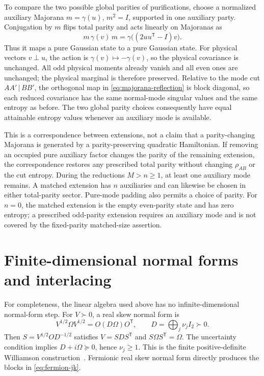 \documentclass[11pt,a4paper]{article}
\numberwithin{equation}{section}
\theoremstyle{remark}
\newcommand{\T}{\mathsf T}
\begin{document}
To compare the two possible global parities of purifications, choose a normalized auxiliary Majorana $m=\gamma(u)$, $m^2=I$, supported in one auxiliary party. Conjugation by $m$ flips total parity and acts linearly on Majoranas as
\begin{equation}\label{eq:majorana-reflection}
 m\,\gamma(v)\,m=\gamma\bigl((2uu^{\T}-I)v\bigr).
\end{equation}
Thus it maps a pure Gaussian state to a pure Gaussian state. For physical vectors $v\perp u$, the action is $\gamma(v)\mapsto-\gamma(v)$, so the physical covariance is unchanged. All odd physical moments already vanish and all even ones are unchanged; the physical marginal is therefore preserved. Relative to the mode cut $AA'\,|\,BB'$, the orthogonal map in \eqref{eq:majorana-reflection} is block diagonal, so each reduced covariance has the same normal-mode singular values and the same entropy as before. The two global parity choices consequently have equal attainable entropy values whenever an auxiliary mode is available.

This is a correspondence between extensions, not a claim that a parity-changing Majorana is generated by a parity-preserving quadratic Hamiltonian. If removing an occupied pure auxiliary factor changes the parity of the remaining extension, the correspondence restores any prescribed total parity without changing $\rho_{AB}$ or the cut entropy. During the reductions $M>n\ge1$, at least one auxiliary mode remains. A matched extension has $n$ auxiliaries and can likewise be chosen in either total-parity sector. Pure-mode padding also permits a choice of parity. For $n=0$, the matched extension is the empty even-parity state and has zero entropy; a prescribed odd-parity extension requires an auxiliary mode and is not covered by the fixed-parity matched-size assertion.

\section{Finite-dimensional normal forms and interlacing}\label{app:linear}
For completeness, the linear algebra used above has no infinite-dimensional normal-form step. For $V\succ0$, a real skew normal form is
\begin{equation}
 V^{1/2}\Omega V^{1/2}=O(D\Omega)O^{\T},\qquad
 D=\bigoplus_j\nu_jI_2\succ0.
\end{equation}
Then $S=V^{1/2}OD^{-1/2}$ satisfies $V=SDS^{\T}$ and $S\Omega S^{\T}=\Omega$. The uncertainty condition implies $D+i\Omega\succeq0$, hence $\nu_j\ge1$. This is the finite positive-definite Williamson construction~\cite{Williamson1936}. Fermionic real skew normal form directly produces the blocks in \eqref{eq:fermion-jk}.
\end{document}
